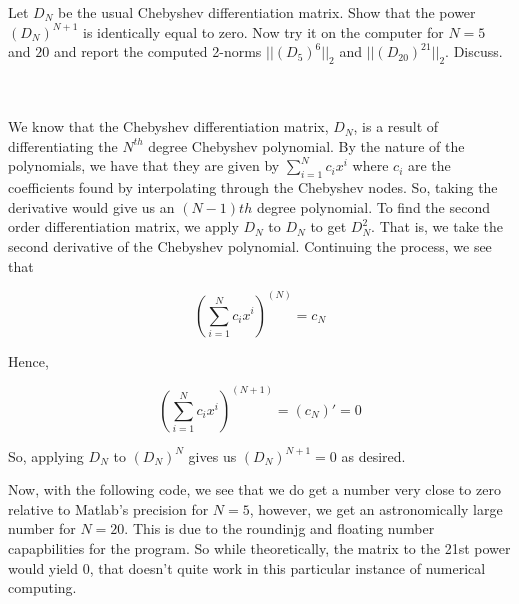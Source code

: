 Let $D_N$ be the usual Chebyshev differentiation matrix. Show that the power $(D_N)^{N+1}$ is
identically equal to zero. Now try it on the computer for $N=5$ and $20$ and report the computed 2-norms
$||(D_5)^6||_2$ and $||(D_{20})^{21}||_2$. Discuss.\\\\

\begin{solution}\renewcommand{\qedsymbol}{}\ \\
    We know that the Chebyshev differentiation matrix, $D_N$, is a result of differentiating the
    $N^{th}$ degree Chebyshev polynomial. By the nature of the polynomials, we have that they are given
    by $\sum_{i=1}^Nc_ix^i$ where $c_i$ are the coefficients found by interpolating through the
    Chebyshev nodes. So, taking the derivative would give us an $(N-1)th$ degree polynomial. To find
    the second order differentiation matrix, we apply $D_N$ to $D_N$ to get $D_N^2$. That is, we take
    the second derivative of the Chebyshev polynomial. Continuing the process, we see that

    $$(\sum_{i=1}^Nc_ix^i)^{(N)}=c_N$$

    Hence,

    $$(\sum_{i=1}^Nc_ix^i)^{(N+1)}=(c_N)'=0$$

    So, applying $D_N$ to $(D_N)^N$ gives us $(D_N)^{N+1}=0$ as desired.

    Now, with the following code, we see that we do get a number very close to zero relative to Matlab's precision for
    $N=5$, however, we get an astronomically large number for $N=20$. This is due to the roundinjg and floating number
    capapbilities for the program. So while theoretically, the matrix to the 21st power would yield 0, that doesn't quite
    work in this particular instance of numerical computing.

\end{solution}

\newpage

\newpage 